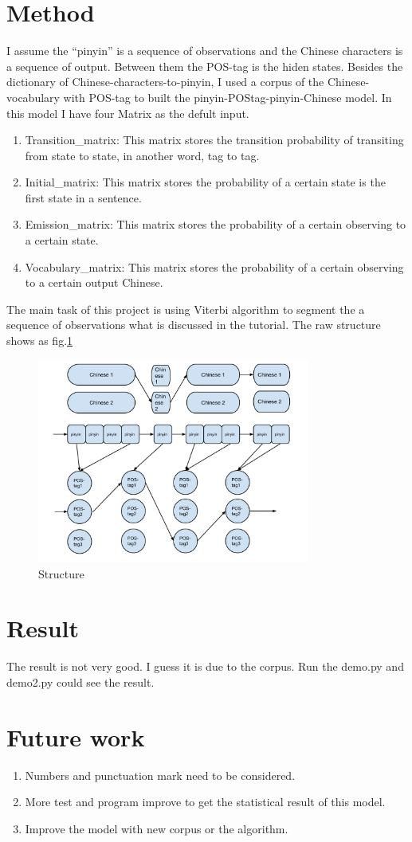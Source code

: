 \documentclass[12pt]{article}
\begin{document}
\section{Method}
I assume the ``pinyin'' is a sequence of observations and the Chinese characters is a sequence of output. Between them the POS-tag is the hiden states. 
Besides the dictionary of Chinese-characters-to-pinyin, I used a corpus of the Chinese-vocabulary with POS-tag to built the pinyin-POStag-pinyin-Chinese model. In this model I have four Matrix as the defult input. 
\begin{enumerate}
\item
Transition\_matrix: This matrix stores the transition probability of transiting from state to state, in another word, tag to tag.
\item
Initial\_matrix: This matrix stores the probability of a certain state is the first state in a sentence.
\item
Emission\_matrix: This matrix stores the probability of a certain observing to a certain state.
\item 
Vocabulary\_matrix: This matrix stores the probability of a certain observing to a certain output Chinese. 
\end{enumerate}
The main task of this project is using Viterbi algorithm to segment the a sequence of observations what is discussed in the tutorial. The raw structure shows as fig.\ref{fig:structure}
\begin{figure}[htp]
	\centering
	\includegraphics[width=0.8\textwidth]{py2tag2chinese.pdf}
	\caption{Structure}
	\label{fig:structure}
\end{figure}

\section{Result}
The result is not very good. I guess it is due to the corpus.
Run the demo.py and demo2.py could see the result. 
\section{Future work}
\begin{enumerate}
\item
Numbers and punctuation mark need to be considered.
\item
More test and program improve to get the statistical result of this model.
\item
Improve the model with new corpus or the algorithm.
\end{enumerate}
\end{document}
